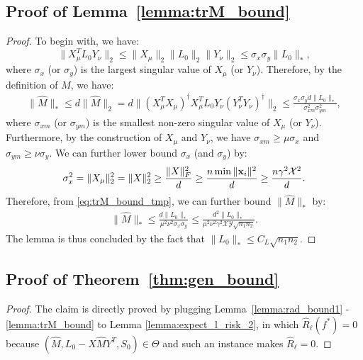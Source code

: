 \documentclass[twoside,11pt]{article}
\def\bx{{\bf x}}
\def\xmax{{\mathcal X}}
\def\ymax{{\mathcal Y}}
\def\wM{\hat{M}}
\def\realL{L_0}
\def\realS{S_0}
\begin{document}
\subsection*{Proof of Lemma~\ref{lemma:trM_bound}}
\begin{proof}
To begin with, we have:
  \begin{equation*}
    \|X_\mu^T\realL Y_\nu\|_2 \leq \|X_\mu\|_2\|\realL\|_2\|Y_\nu\|_2 \leq
    \sigma_x\sigma_y\|\realL\|_*,
  \end{equation*}
  where $\sigma_x$ (or $\sigma_y$) is the largest singular value of $X_\mu$ (or $Y_\nu$).
  Therefore, by the definition of $\wM$, we have:
  \begin{align}
    \|\wM\|_*
    \leq d \|\wM\|_2
    = d\|(X_{\mu}^TX_\mu)^{\dagger}X_\mu^T\realL Y_\nu(Y_\nu^TY_\nu)^{\dagger}\|_2
    \leq \frac{\sigma_x\sigma_yd\|\realL\|_*}{\sigma_{xm}^2\sigma_{ym}^2},
    \label{eq:trM_bound_tmp}
  \end{align}
  where $\sigma_{xm}$ (or $\sigma_{ym}$)
  is the smallest non-zero singular value of $X_\mu$ (or $Y_\nu$).
  Furthermore, by the construction of
  $X_\mu$ and $Y_\nu$, we have $\sigma_{xm} \geq \mu\sigma_x$ and $\sigma_{ym} \geq \nu\sigma_y$.
  We can further lower bound $\sigma_x$ (and $\sigma_y$) by:
  \begin{equation*}
    \sigma_x^2 = \|X_\mu\|_2^2 = \|X\|_2^2 \geq \frac{\|X\|^2_F}{d} \geq \frac{n\min\|\bx_i\|^2}{d}
    \geq \frac{n\gamma^2\xmax^2}{d}.
  \end{equation*}
  Therefore, from \eqref{eq:trM_bound_tmp}, we can further bound $\|\wM\|_*$ by:
  \begin{align*}
    \|\wM\|_*  \leq \frac{d\|\realL\|_*}{\mu^2\nu^2\sigma_x\sigma_y}
    \leq \frac{d^2\|\realL\|_*}{\mu^2\nu^2\gamma^2\xmax\ymax\sqrt{n_1 n_2}}.
  \end{align*}
  The lemma is thus concluded by the fact that
  $\|\realL\|_* \leq C_L \sqrt{n_1 n_2}$.
\end{proof}

\subsection*{Proof of Theorem~\ref{thm:gen_bound}}
\begin{proof}
  The claim is directly proved by plugging Lemma~\ref{lemma:rad_bound1} - \ref{lemma:trM_bound}
  to Lemma \ref{lemma:expect_l_risk_2}, in which $\hat{R}_\ell(f^*) = 0$ because
  $(\hat{M}, \realL-X \hat{M} Y^T, \realS) \in \Theta$ and such an instance makes
  $\hat{R}_\ell = 0$.
\end{proof}
\end{document}
